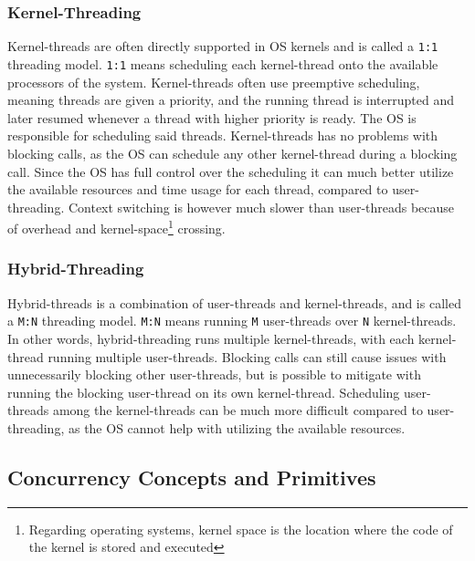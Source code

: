 \subsubsection{Kernel\hyp{}Threading}


Kernel\hyp{}threads are often directly supported in OS kernels and is called a \texttt{1:1} threading model. \texttt{1:1} means scheduling each kernel\hyp{}thread onto the available processors of the system. Kernel\hyp{}threads often use preemptive scheduling, meaning threads are given a priority, and the running thread is interrupted and later resumed whenever a thread with higher priority is ready. The OS is responsible for scheduling said threads. Kernel\hyp{}threads has no problems with blocking calls, as the OS can schedule any other kernel\hyp{}thread during a blocking call. Since the OS has full control over the scheduling it can much better utilize the available resources and time usage for each thread, compared to user\hyp{}threading. Context switching is however much slower than user\hyp{}threads because of overhead and kernel\hyp{}space\footnote{Regarding operating systems, kernel space is the location where the code of the kernel is stored and executed} crossing.


\subsubsection{Hybrid\hyp{}Threading}


Hybrid\hyp{}threads is a combination of user\hyp{}threads and kernel\hyp{}threads, and is called a \texttt{M:N} threading model. \texttt{M:N} means running \texttt{M} user\hyp{}threads over \texttt{N} kernel\hyp{}threads. In other words, hybrid\hyp{}threading runs multiple kernel\hyp{}threads, with each kernel\hyp{}thread running multiple user\hyp{}threads. Blocking calls can still cause issues with unnecessarily blocking other user\hyp{}threads, but is possible to mitigate with running the blocking user\hyp{}thread on its own kernel\hyp{}thread. Scheduling user\hyp{}threads among the kernel\hyp{}threads can be much more difficult compared to user\hyp{}threading, as the OS cannot help with utilizing the available resources. 


\subsection{Concurrency Concepts and Primitives}
\label{subsec:concepts_primitives}


